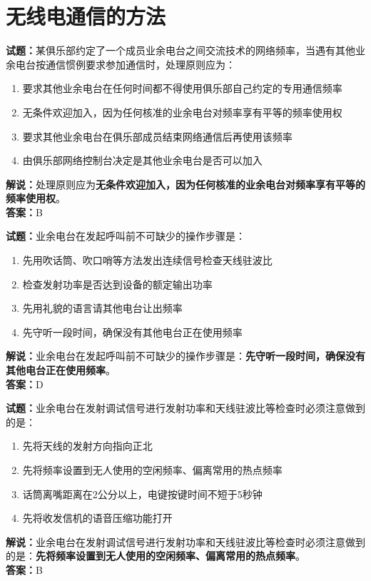 \documentclass{ctexbook}
\begin{document}










\chapter{无线电通信的方法}



\noindent\textbf{试题：}某俱乐部约定了一个成员业余电台之间交流技术的网络频率，当遇有其他业余电台按通信惯例要求参加通信时，处理原则应为：
\begin{enumerate}[leftmargin=3em]
	\item 要求其他业余电台在任何时间都不得使用俱乐部自己约定的专用通信频率
	\item 无条件欢迎加入，因为任何核准的业余电台对频率享有平等的频率使用权
	\item 要求其他业余电台在俱乐部成员结束网络通信后再使用该频率
	\item 由俱乐部网络控制台决定是其他业余电台是否可以加入
\end{enumerate}
\noindent\textbf{解说：}处理原则应为\textbf{无条件欢迎加入，因为任何核准的业余电台对频率享有平等的频率使用权}。\\\noindent\textbf{答案：}B

\bigskip


\noindent\textbf{试题：}业余电台在发起呼叫前不可缺少的操作步骤是：
\begin{enumerate}[leftmargin=3em]
	\item 先用吹话筒、吹口哨等方法发出连续信号检查天线驻波比
	\item 检查发射功率是否达到设备的额定输出功率
	\item 先用礼貌的语言请其他电台让出频率
	\item 先守听一段时间，确保没有其他电台正在使用频率
\end{enumerate}
\noindent\textbf{解说：}业余电台在发起呼叫前不可缺少的操作步骤是：\textbf{先守听一段时间，确保没有其他电台正在使用频率}。\\\noindent\textbf{答案：}D%

\bigskip


\noindent\textbf{试题：}业余电台在发射调试信号进行发射功率和天线驻波比等检查时必须注意做到的是：
\begin{enumerate}[leftmargin=3em]	
	\item 先将天线的发射方向指向正北
	\item 先将频率设置到无人使用的空闲频率、偏离常用的热点频率
	\item 话筒离嘴距离在2公分以上，电键按键时间不短于5秒钟
	\item 先将收发信机的语音压缩功能打开
\end{enumerate}
\noindent\textbf{解说：}业余电台在发射调试信号进行发射功率和天线驻波比等检查时必须注意做到的是：\textbf{先将频率设置到无人使用的空闲频率、偏离常用的热点频率}。\\\noindent\textbf{答案：}B
\end{document}
